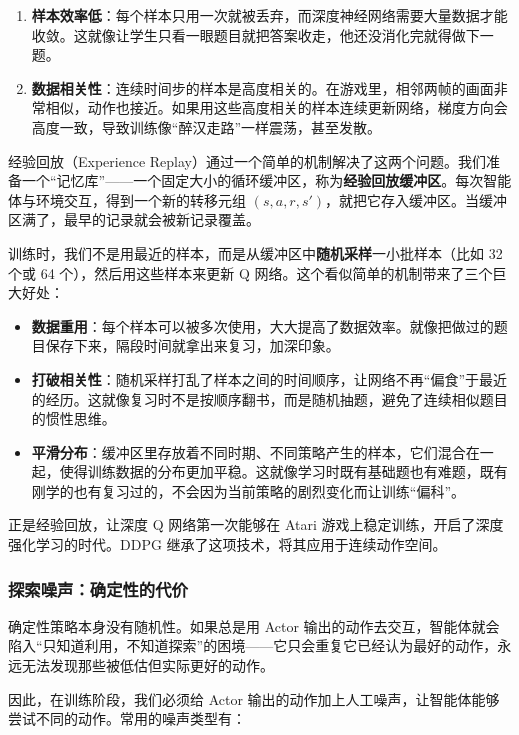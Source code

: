 \documentclass[lang=cn,zihao=-4,a4paper,fontset=windows]{beautybook}
\begin{document}
\begin{enumerate}
    \item \textbf{样本效率低}：每个样本只用一次就被丢弃，而深度神经网络需要大量数据才能收敛。这就像让学生只看一眼题目就把答案收走，他还没消化完就得做下一题。
    \item \textbf{数据相关性}：连续时间步的样本是高度相关的。在游戏里，相邻两帧的画面非常相似，动作也接近。如果用这些高度相关的样本连续更新网络，梯度方向会高度一致，导致训练像“醉汉走路”一样震荡，甚至发散。
\end{enumerate}

经验回放（Experience Replay）通过一个简单的机制解决了这两个问题。我们准备一个“记忆库”——一个固定大小的循环缓冲区，称为\textbf{经验回放缓冲区}。每次智能体与环境交互，得到一个新的转移元组 \((s, a, r, s')\)，就把它存入缓冲区。当缓冲区满了，最早的记录就会被新记录覆盖。

训练时，我们不是用最近的样本，而是从缓冲区中\textbf{随机采样}一小批样本（比如 32 个或 64 个），然后用这些样本来更新 Q 网络。这个看似简单的机制带来了三个巨大好处：

\begin{itemize}
    \item \textbf{数据重用}：每个样本可以被多次使用，大大提高了数据效率。就像把做过的题目保存下来，隔段时间就拿出来复习，加深印象。
    \item \textbf{打破相关性}：随机采样打乱了样本之间的时间顺序，让网络不再“偏食”于最近的经历。这就像复习时不是按顺序翻书，而是随机抽题，避免了连续相似题目的惯性思维。
    \item \textbf{平滑分布}：缓冲区里存放着不同时期、不同策略产生的样本，它们混合在一起，使得训练数据的分布更加平稳。这就像学习时既有基础题也有难题，既有刚学的也有复习过的，不会因为当前策略的剧烈变化而让训练“偏科”。
\end{itemize}

正是经验回放，让深度 Q 网络第一次能够在 Atari 游戏上稳定训练，开启了深度强化学习的时代。DDPG 继承了这项技术，将其应用于连续动作空间。

\subsubsection{探索噪声：确定性的代价}

确定性策略本身没有随机性。如果总是用 Actor 输出的动作去交互，智能体就会陷入“只知道利用，不知道探索”的困境——它只会重复它已经认为最好的动作，永远无法发现那些被低估但实际更好的动作。

因此，在训练阶段，我们必须给 Actor 输出的动作加上人工噪声，让智能体能够尝试不同的动作。常用的噪声类型有：
\end{document}

